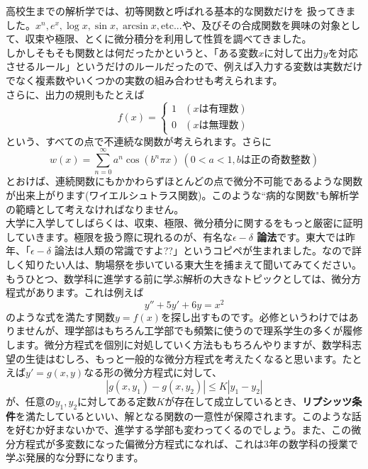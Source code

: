 高校生までの解析学では、初等関数と呼ばれる基本的な関数だけを 扱ってきました。$x^n,e^x,\log x,\sin x,\arcsin x,$etc...や、及びその合成関数を興味の対象として、収束や極限、とくに微分積分を利用して性質を調べてきました。\\
しかしそもそも関数とは何だったかというと、「ある変数$x$に対して出力$y$を対応させるルール」というだけのルールだったので、例えば入力する変数は実数だけでなく複素数やいくつかの実数の組み合わせも考えられます。\\
さらに、出力の規則もたとえば
\begin{equation*}
  f(x) = \begin{cases}
    1 & (xは有理数) \\
    0 & (xは無理数)
  \end{cases}
\end{equation*}
という、すべての点で不連続な関数が考えられます。さらに
\[
　w(x) = \sum_{n=0}^\infty a^n \cos(b^n \pi x) \  (0<a<1,bは正の奇数整数)
\]
とおけば、連続関数にもかかわらずほとんどの点で微分不可能であるような関数が出来上がります(ワイエルシュトラス関数)。このような``病的な関数"も解析学の範疇として考えなければなりません。\\
大学に入学してしばらくは、収束、極限、微分積分に関するをもっと厳密に証明していきます。極限を扱う際に現れるのが、有名な{\bf $\epsilon - \delta$ 論法}です。東大では昨年、「$\epsilon - \delta$ 論法は人類の常識ですよ??」というコピペが生まれました。なので詳しく知りたい人は、駒場祭を歩いている東大生を捕まえて聞いてみてください。\\


もうひとつ、数学科に進学する前に学ぶ解析の大きなトピックとしては、微分方程式があります。これは例えば
\[
y'' + 5y' + 6y = x^2
\]
のような式を満たす関数$y = f(x)$を探し出すものです。必修というわけではありませんが、理学部はもちろん工学部でも頻繁に使うので理系学生の多くが履修します。微分方程式を個別に対処していく方法ももちろんやりますが、数学科志望の生徒はむしろ、もっと一般的な微分方程式を考えたくなると思います。たとえば$y' = g(x,y)$なる形の微分方程式に対して、
\[
|g(x,y_1)-g(x,y_2)| \leq K|y_1 - y_2|
\]
が、任意の$y_1,y_2$に対してある定数$K$が存在して成立しているとき、{\bf リプシッツ条件}を満たしているといい、解となる関数の一意性が保障されます。このような話を好むか好まないかで、進学する学部も変わってくるのでしょう。また、この微分方程式が多変数になった偏微分方程式になれば、これは3年の数学科の授業で学ぶ発展的な分野になります。\\

